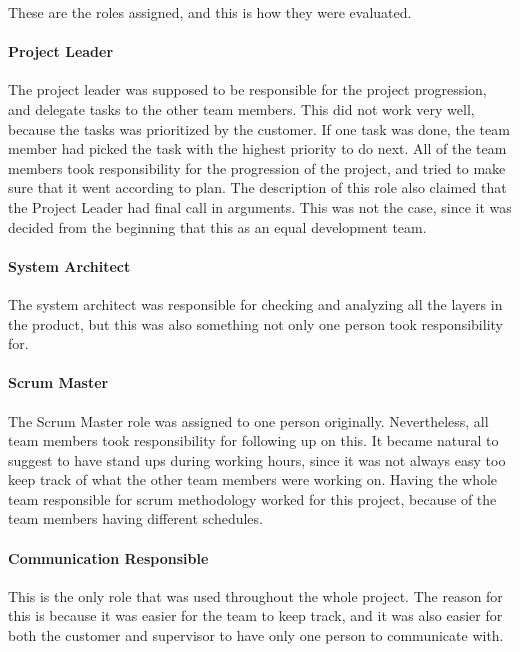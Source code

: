 These are the roles assigned, and this is how they were evaluated.

\paragraph{Project Leader}
The project leader was supposed to be responsible for the project progression, and delegate tasks to the other team members. This did not work very well, because the tasks was prioritized by the customer. If one task was done, the team member had picked the task with the highest priority to do next. All of the team members took responsibility for the progression of the project, and tried to make sure that it went according to plan. The description of this role also claimed that the Project Leader had final call in arguments. This was not the case, since it was decided from the beginning that this as an equal development team.

\paragraph{System Architect}
The system architect was responsible for checking and analyzing all the layers in the product, but this was also something not only one person took responsibility for. 

\paragraph{Scrum Master}
The Scrum Master role was assigned to one person originally. Nevertheless, all team members took responsibility for following up on this. It became natural to suggest to have stand ups during working hours, since it was not always easy too keep track of what the other team members were working on. Having the whole team responsible for scrum methodology worked for this project, because of the team members having different schedules. 

\paragraph{Communication Responsible}
This is the only role that was used throughout the whole project. The reason for this is because it was easier for the team to keep track, and it was also easier for both the customer and supervisor to have only one person to communicate with.    

